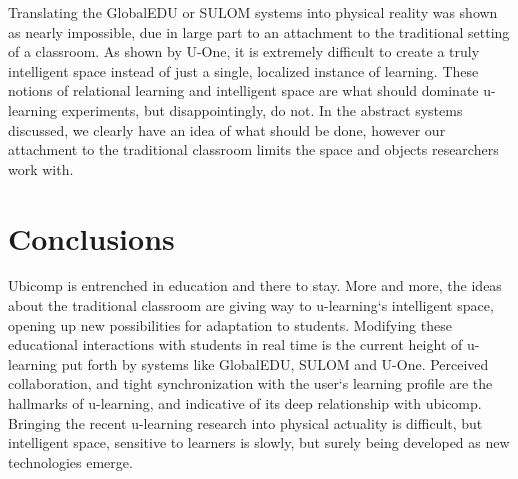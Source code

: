 \documentclass[twoside]{article}
\begin{document}
\begin{multicols}{2}
\setlength\parindent{24pt}	Translating the GlobalEDU or SULOM systems into physical reality was shown as nearly impossible, due in large part to an attachment to the traditional setting of a classroom. As shown by U-One, it is extremely difficult to create a truly intelligent space instead of just a single, localized instance of learning.  These notions of relational learning and intelligent space are what should dominate u-learning experiments, but disappointingly, do not. In the abstract systems discussed, we clearly have an idea of what should be done, however our attachment to the traditional classroom limits the space and objects researchers work with.


\section{Conclusions}

\setlength\parindent{24pt}	Ubicomp is entrenched in education and there to stay. More and more, the ideas about the traditional classroom are giving way to u-learning`s intelligent space, opening up new possibilities for adaptation to students. Modifying these educational interactions with students in real time is the current height of u-learning put forth by systems like GlobalEDU, SULOM and U-One. Perceived collaboration, and tight synchronization with the user`s learning profile are the hallmarks of u-learning, and indicative of its deep relationship with ubicomp. Bringing the recent u-learning research into physical actuality is difficult, but intelligent space, sensitive to learners is slowly, but surely being developed as new technologies emerge.


\begin{thebibliography}{99} %


\end{thebibliography}
\end{multicols}
\end{document}

